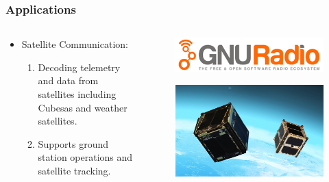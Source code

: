 
\begin{frame}
	\frametitle{Applications}
    
\begin{columns}
        \begin{column}{0.5\textwidth}
     \begin{itemize}
    \item Satellite Communication:
    \begin{enumerate}
        \item Decoding telemetry and data from satellites including Cubesas and weather satellites.
        \item Supports ground station operations and satellite tracking.
    \end{enumerate}
     \end{itemize}
     
        \end{column}
        
        \begin{column}{0.5\textwidth}
            \begin{figure}[]
                \centering
                \includegraphics[width=\linewidth]{img/GNU_radio_logo.png}
                \label{fig:gnu_radio_logo}
            \end{figure}
            \begin{figure}
                \centering
                \includegraphics[width=\linewidth]{img/applications/satellite.png}
                \label{fig:enter-label}
            \end{figure}
        \end{column}
    \end{columns}
\end{frame}

